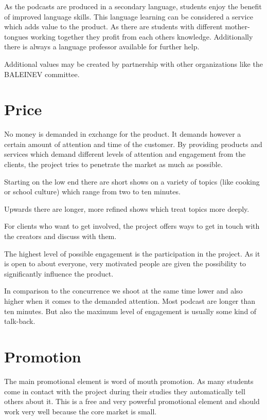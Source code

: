 As the podcasts are produced in a secondary language, students enjoy the
benefit of improved language skills. This language learning can be
considered a service which adds value to the product. As there are
students with different mother-tongues working together they profit from
each others knowledge. Additionally there is always a language professor
available for further help.

Additional values may be created by partnership with other organizations
like the BALEINEV committee.

\section{Price}

No money is demanded in exchange for the product. It demands however a
certain amount of attention and time of the customer. By providing
products and services which demand different levels of attention and
engagement from the clients, the project tries to penetrate the market
as much as possible.

Starting on the low end there are short shows on a variety of topics
(like cooking or school culture) which range from two to ten minutes.

Upwards there are longer, more refined shows which treat topics more
deeply.

For clients who want to get involved, the project offers ways to get in
touch with the creators and discuss with them.

The highest level of possible engagement is the participation in the
project. As it is open to about everyone, very motivated people are
given the possibility to significantly influence the product.

In comparison to the concurrence we shoot at the same time lower and
also higher when it comes to the demanded attention. Most podcast are
longer than ten minutes. But also the maximum level of engagement is
usually some kind of talk-back.

\section{Promotion}

The main promotional element is word of mouth promotion. As many
students come in contact with the project during their studies they
automatically tell others about it. This is a free and very powerful
promotional element and should work very well because the core market is
small.

